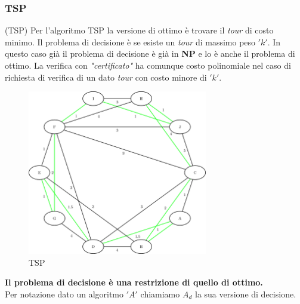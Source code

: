 			\subsubsection{TSP}
			\begin{definizione}(TSP)
				Per l'algoritmo TSP la versione di ottimo è trovare il \emph{tour} di costo
				minimo. Il problema di decisione è se esiste un \emph{tour} di massimo peso
				$ 'k' $. In questo caso già il problema di decisione è già in \textbf{NP} e lo è
				anche il problema di ottimo. La verifica con \textit{"certificato"} ha comunque costo
				polinomiale nel caso di richiesta di verifica di un dato \emph{tour} con costo
				minore di $ 'k' $. 
				\begin{figure}[h!]
					\centering
					\includegraphics[width=0.7\textwidth]{img/images_tsp2.png}
					\caption{TSP}
					\label{fig:TSP}
				\end{figure}
			\end{definizione}
			\textbf{Il problema di decisione è una restrizione di quello di ottimo.}\\
			Per notazione dato un algoritmo $ 'A' $ chiamiamo $A_d$ la sua versione di
			decisione.\\
